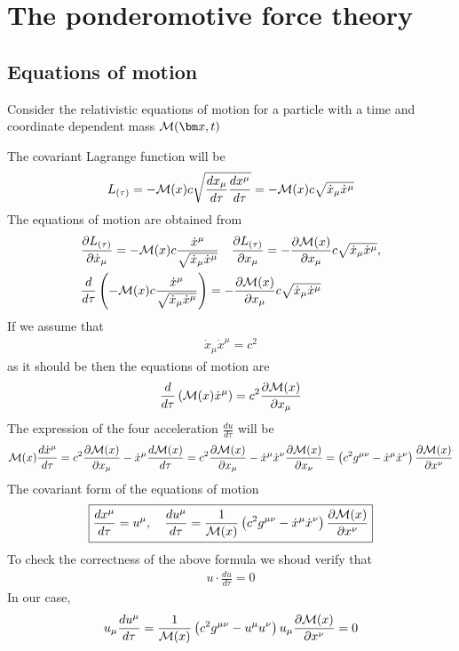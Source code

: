 

\chapter{The ponderomotive force theory}
\section{Equations of motion}

Consider the relativistic equations of motion for a particle with a time and coordinate dependent mass ${\cal M}({\bm x},t)$

The covariant Lagrange function will be
\begin{align}
 L_{(\tau)} = -{\cal M}(x) c\sqrt{\frac{dx_\mu}{d\tau}\frac{dx^\mu}{d\tau}}=-{\cal M}(x) c\sqrt{\dot x_{\mu}\dot x^{\mu}}
\end{align}
The equations of motion are obtained from
\begin{align}
 &\frac{\partial L_{(\tau)}}{\partial\dot x_\mu}=-{\cal M}(x)c\frac{\dot x^{\mu}}{\sqrt{\dot x_{\mu}\dot x^{\mu}}}\quad \frac{\partial L_{(\tau)}}{\partial x_{\mu}}=-\frac{\partial {\cal M}(x)}{\partial x_\mu}c\sqrt{\dot x_{\mu}\dot x^{\mu}},\\
  &\frac{d}{d\tau}\left(-{\cal M}(x)c\frac{\dot x^{\mu}}{\sqrt{\dot x_{\mu}\dot x^{\mu}}}\right)=-\frac{\partial {\cal M}(x)}{\partial x_{\mu}}c\sqrt{\dot x_\mu\dot x^\mu}
\end{align}
If we assume that
\begin{align}
 \dot x_\mu\dot x^{\mu} = c^2
\end{align}
as it should be then the equations of motion are
\begin{align}
    \frac{d}{d\tau}\left({\cal M}(x)\dot x^{\mu}\right)=c^2\frac{\partial {\cal M}(x)}{\partial x_{\mu}}
\end{align}
The expression of the four acceleration $\frac{du}{d\tau}$ will be  
\begin{align}
{\cal M}(x)\frac{d\dot x^{\mu}}{d\tau}=c^2\frac{\partial{\cal M}(x)}{\partial x_{\mu}}-\dot x^{\mu} \frac{d{\cal M}(x)}{d\tau}=c^2\frac{\partial{\cal M}(x)}{\partial x_{\mu}}-\dot x^{\mu}\dot x^{\nu}\frac{\partial{\cal M}(x)}{\partial x_{\nu}}=\left(c^2 g^{\mu\nu} -\dot x^{\mu}\dot x^{\nu}\right)\frac{\partial{\cal M}(x)}{\partial x^{\nu}}
\end{align}
The covariant form of the equations of motion 
\begin{align}
    \boxed{\frac{dx^{\mu}}{d\tau}=u^{\mu},\quad \frac{du^{\mu}}{d\tau}=\frac{1}{{\cal M}(x)}\left(c^2 g^{\mu\nu} -\dot x^{\mu}\dot x^{\nu}\right)\frac{\partial{\cal M}(x)}{\partial x^{\nu}}}
\end{align}
To check the correctness of the above formula we shoud verify that
\begin{align}
    u\cdot \frac{du}{d\tau}=0
\end{align}
In our case,
\begin{align}
u_\mu\frac{du^\mu}{d\tau}=\frac{1}{{\cal M}(x)}\left(c^2 g^{\mu\nu} -u^{\mu}u^{\nu}\right)u_\mu\frac{\partial{\cal M}(x)}{\partial x^{\nu}}=0
\end{align}


